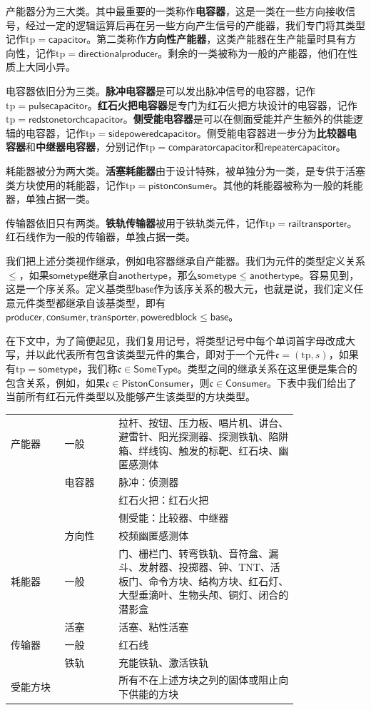 \documentclass[a4,11pt]{aleph-notas}
\begin{document}
产能器分为三大类。其中最重要的一类称作\textbf{电容器}，这是一类在一些方向接收信号，经过一定的逻辑运算后再在另一些方向产生信号的产能器，我们专门将其类型记作$\mathrm{tp}=\mathsf{capacitor}$。第二类称作\textbf{方向性产能器}，这类产能器在生产能量时具有方向性，记作$\mathrm{tp}=\mathsf{directionalproducer}$。剩余的一类被称为一般的产能器，他们在性质上大同小异。

电容器依旧分为三类。\textbf{脉冲电容器}是可以发出脉冲信号的电容器，记作$\mathrm{tp}=\mathsf{pulsecapacitor}$。\textbf{红石火把电容器}是专门为红石火把方块设计的电容器，记作$\mathrm{tp}=\mathsf{redstonetorchcapacitor}$。\textbf{侧受能电容器}是可以在侧面受能并产生额外的供能逻辑的电容器，记作$\mathrm{tp}=\mathsf{sidepoweredcapacitor}$。侧受能电容器进一步分为\textbf{比较器电容器}和\textbf{中继器电容器}，分别记作$\mathrm{tp}=\mathsf{comparatorcapacitor}$和$\mathsf{repeatercapacitor}$。

耗能器被分为两大类。\textbf{活塞耗能器}由于设计特殊，被单独分为一类，是专供于活塞类方块使用的耗能器，记作$\mathrm{tp}=\mathsf{pistonconsumer}$。其他的耗能器被称为一般的耗能器，单独占据一类。

传输器依旧只有两类。\textbf{铁轨传输器}被用于铁轨类元件，记作$\mathrm{tp}=\mathsf{railtransporter}$。红石线作为一般的传输器，单独占据一类。

我们把上述分类视作继承，例如电容器继承自产能器。我们为元件的类型定义关系$\le$，如果$\mathsf{sometype}$继承自$\mathsf{anothertype}$，那么$\mathsf{sometype}\le\mathsf{anothertype}$。容易见到，这是一个序关系。定义基类型$\mathsf{base}$作为该序关系的极大元，也就是说，我们定义任意元件类型都继承自该基类型，即有$\mathsf{producer},\mathsf{consumer},\mathsf{transporter},\mathsf{poweredblock}\le\mathsf{base}$。

在下文中，为了简便起见，我们复用记号，将类型记号中每个单词首字母改成大写，并以此代表所有包含该类型元件的集合，即对于一个元件$\mathfrak{c}=(\mathrm{tp},s)$，如果有$\mathrm{tp}=\mathsf{sometype}$，我们称$\mathfrak{c}\in\mathsf{SomeType}$。类型之间的继承关系在这里便是集合的包含关系，例如，如果$\mathfrak{c}\in\mathsf{PistonConsumer}$，则$\mathfrak{c}\in\mathsf{Consumer}$。下表中我们给出了当前所有红石元件类型以及能够产生该类型的方块类型。

\begin{longtable}{ p{0.15\linewidth}  p{0.15\linewidth}  p{0.5\linewidth} }
    产能器&一般&拉杆、按钮、压力板、唱片机、讲台、避雷针、阳光探测器、探测铁轨、陷阱箱、绊线钩、触发的标靶、红石块、幽匿感测体\\
    &电容器&脉冲：侦测器\\
    &&红石火把：红石火把\\
    &&侧受能：比较器、中继器\\
    &方向性&校频幽匿感测体\\
    耗能器&一般&门、栅栏门、转弯铁轨、音符盒、漏斗、发射器、投掷器、钟、TNT、活板门、命令方块、结构方块、红石灯、大型垂滴叶、生物头颅、铜灯、闭合的潜影盒\\
    &活塞&活塞、粘性活塞\\
    传输器&一般&红石线\\
    &铁轨&充能铁轨、激活铁轨\\
    受能方块&&所有不在上述方块之列的固体或阻止向下供能的方块
\end{longtable}
\end{document}
